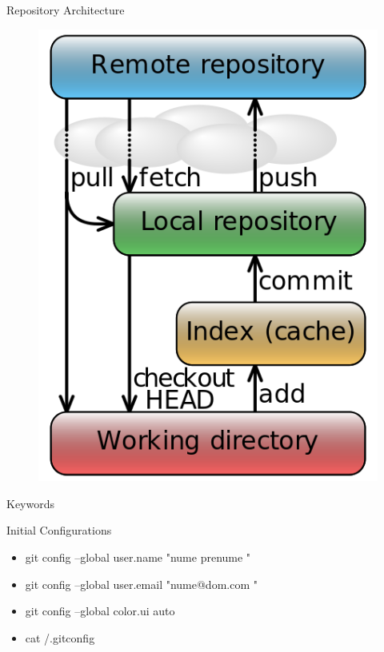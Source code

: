 \documentclass{workshop}
\begin{document}
\begin{frame}{Repository Architecture}
\begin{figure}
  \includegraphics[scale=0.3]{img/flow.png}
\end{figure}
\end{frame}

\begin{frame}{Keywords}
\end{frame}

\begin{frame}{Initial Configurations}
\begin{itemize}
\item git config --global user.name "nume prenume "
\item git config --global user.email "nume@dom.com "
\item git config --global color.ui auto
\item cat /.gitconfig
\end{itemize}
\end{frame}
\end{document}
